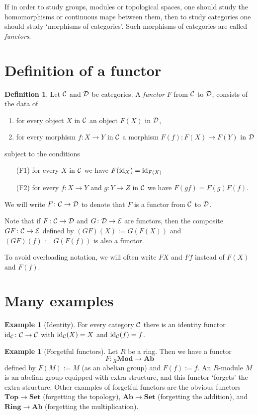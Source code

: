 \documentclass[11pt]{amsbook}
\DeclareMathOperator\Mod{{\bf{Mod}}}
\def\cE{{\mathcal{E}}} \def\cG{{\mathcal{G}}} \def\cH{{\mathcal{H}}}
\def\id{{\rm id}}
\def\Set{\mathbf{Set}}
\def\Ab{\mathbf{Ab}}
\def\Top{\mathbf{Top}}
\def\Ring{\mathbf{Ring}}
\def\Mod{\mathbf{Mod}}
\theoremstyle{plain}
\theoremstyle{definition}
\newtheorem{definition}[theorem]{Definition}
\newtheorem{example}[theorem]{Example}
\begin{document}
If in order to study groups, modules or topological spaces, one should study the homomorphisms or continuous maps between them, then to study categories one should study `morphisms of categories'. Such morphisms of categories are called \emph{functors}. 

\section{Definition of a functor}

\begin{definition} Let ${\mathcal{C}}$ and ${\mathcal{D}}$ be categories. A \emph{functor} $F$ from ${\mathcal{C}}$ to ${\mathcal{D}}$, consists of the data of
\begin{enumerate}
\item for every object $X$ in ${\mathcal{C}}$ an object $F(X)$ in ${\mathcal{D}}$,
\item for every morphism $f\colon X\to Y$ in ${\mathcal{C}}$ a morphism $F(f)\colon F(X) \to F(Y)$ in ${\mathcal{D}}$
\end{enumerate}
subject to the conditions
\begin{enumerate}
\item[(F1)] for every $X$ in ${\mathcal{C}}$ we have $F(\id_X) = \id_{F(X)}$
\item[(F2)] for every $f\colon X\to Y$ and $g\colon Y\to Z$ in ${\mathcal{C}}$ we have $F(gf)=F(g)F(f)$.
\end{enumerate}
\end{definition}

We will  write $F\colon {\mathcal{C}}\to {\mathcal{D}}$ to denote that $F$ is a functor from ${\mathcal{C}}$ to ${\mathcal{D}}$.

Note that if $F\colon {\mathcal{C}}\to {\mathcal{D}}$ and $G\colon \cD \to \cE$ are functors, then  the composite $GF\colon \cC \to \cE$ defined by $(GF)(X) := G(F(X))$ and $(GF)(f) := G(F(f))$ is also a functor. 

To avoid overloading notation, we will often write $FX$ and $Ff$ instead of $F(X)$ and $F(f)$.

\section{Many examples}

\begin{example}[Identity]
For every category ${\mathcal{C}}$  there is an identity functor
$\id_\cC \colon \cC \to \cC$ with $\id_\cC(X) = X$ and $\id_\cC(f)= f$. 
\end{example}

\begin{example}[Forgetful functors]\label{exa:forgetful}
Let $R$ be a ring. Then we have a functor
\[
	F\colon {}_R\Mod \to \Ab
\]
defined by $F(M):=M$ (as an abelian group) and $F(f):=f$. 
An $R$-module $M$ is an abelian group equipped with extra structure, and this functor `forgets' the extra structure. Other examples of forgetful functors are the obvious functors $\Top \to \Set$ (forgetting the topology), $\Ab \to \Set$ (forgetting the addition), and $\Ring \to \Ab$ (forgetting the multiplication).
\end{example}
 
\end{document}
